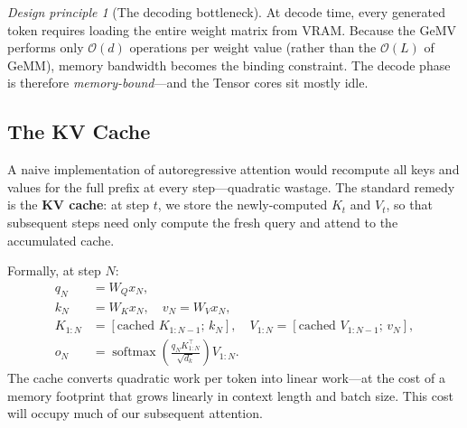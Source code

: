 \documentclass[11pt,a4paper]{article}
\theoremstyle{definition}
\theoremstyle{remark}
\newtheorem*{principle}{Design principle}
\theoremstyle{plain}
\newcommand{\softmax}{\operatorname{softmax}}
\newcommand{\bigO}{\mathcal{O}}
\begin{document}
\begin{center}
\end{center}

\begin{principle}[The decoding bottleneck]
At decode time, every generated token requires loading the entire weight
matrix from VRAM. Because the GeMV performs only $\bigO(d)$ operations per
weight value (rather than the $\bigO(L)$ of GeMM), memory bandwidth
becomes the binding constraint. The decode phase is therefore
\emph{memory-bound}---and the Tensor cores sit mostly idle.
\end{principle}

\subsection{The KV Cache}

A naive implementation of autoregressive attention would recompute all
keys and values for the full prefix at every step---quadratic wastage. The
standard remedy is the \textbf{KV cache}: at step $t$, we store the
newly-computed $K_t$ and $V_t$, so that subsequent steps need only compute
the fresh query and attend to the accumulated cache.

Formally, at step $N$:
\begin{align}
  q_N &= W_Q x_N, \nonumber \\
  k_N &= W_K x_N, \quad v_N = W_V x_N, \nonumber \\
  K_{1:N} &= [\text{cached } K_{1:N-1};\, k_N], \quad V_{1:N} = [\text{cached } V_{1:N-1};\, v_N], \nonumber \\
  o_N &= \softmax\!\left(\frac{q_N K_{1:N}^\top}{\sqrt{d_k}}\right) V_{1:N}.
\end{align}
The cache converts quadratic work per token into linear work---at the cost
of a memory footprint that grows linearly in context length and batch
size. This cost will occupy much of our subsequent attention.
\end{document}
